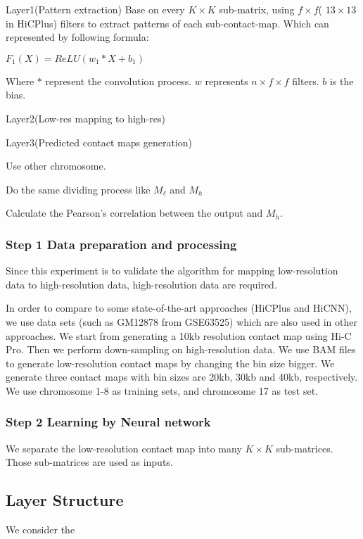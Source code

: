 \documentclass{article}
\begin{document}
\noindent Layer1(Pattern extraction)
Base on every $K \times K$ sub-matrix, using $f \times f$( $13 \times 13$ in HiCPlus) filters
to extract patterns of each sub-contact-map. Which can represented by following formula:
\begin{center}
$F_1(X) = ReLU(w_1 * X + b_1)$
\end{center}
Where $*$ represent the convolution process. $w$ represents $n \times f \times f$ filters. 
$b$ is the bias.
 

\noindent Layer2(Low-res mapping to high-res)

\noindent Layer3(Predicted contact maps generation)


Use other chromosome. 

Do the same dividing process like $M_\ell$ and $M_h$

Calculate the Pearson's correlation between the output and $M_h$.







\subsubsection*{Step 1 Data preparation and processing}
Since this experiment is to validate the algorithm for mapping low-resolution data to high-resolution data, 
high-resolution data are required. 

In order to compare to some state-of-the-art approaches (HiCPlus and HiCNN), 
we use data sets (such as GM12878 from GSE63525) which are also used in other approaches. 
We start from generating a 10kb resolution contact map 
using Hi-C Pro. 
Then we perform down-sampling on high-resolution data. 
We use BAM files to generate low-resolution contact maps by changing the bin size bigger. 
We generate three contact maps with bin sizes are 20kb, 30kb and 40kb, respectively. 
We use chromosome 1-8 as training sets, and chromosome 17 as test set.

\subsubsection*{Step 2 Learning by Neural network}
We separate the low-resolution contact map into many $K \times K$ sub-matrices. 
Those sub-matrices are used as inputs.

\subsection{Layer Structure}
We consider the 





 
\end{document}
